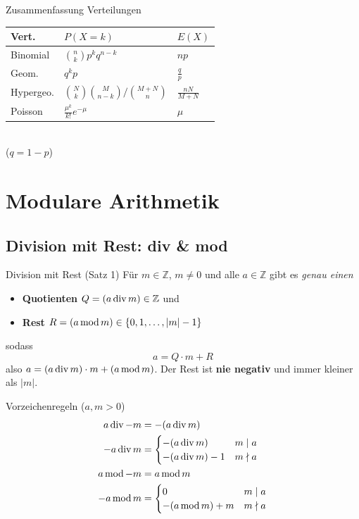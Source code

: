 \documentclass[a4paper, fontsize=7pt]{scrartcl}
\def\Z{\mathbb{Z}}  %
\newcommand{\Div}{\mskip3mu\mathrm{div}\mskip3mu}
\newcommand{\Mod}{\mskip3mu\mathrm{mod}\mskip3mu}
\renewcommand*{\arraystretch}{1.5}  %
\begin{document}
\begin{subbox}{Zusammenfassung Verteilungen}
\renewcommand*{\arraystretch}{1.6}
\begin{tabular}{@{}lll@{}}
\textbf{Vert.} & $P(X = k)$ & $E(X)$ \\ \hline
Binomial & $\binom{n}{k} p^k q^{n-k}$ & $np$ \\
Geom. & $q^k p$ & $\frac{q}{p}$ \\
Hypergeo. & $\binom{N}{k}\binom{M}{n-k} / \binom{M+N}{n}$ & $\frac{nN}{M+N}$ \\
Poisson & $\frac{\mu^k}{k!} e^{-\mu}$ & $\mu$
\end{tabular}\\
($q = 1 - p$)
\end{subbox}

\section{Modulare Arithmetik}

\subsection{Division mit Rest: div \& mod}

\begin{mainbox}{Division mit Rest (Satz 1)}
Für $m \in \Z$, $m \neq 0$ und alle $a \in \Z$ gibt es \emph{genau einen}
\begin{itemize}
    \item \textbf{Quotienten} $Q = (a \Div m) \in \Z$ und
    \item \textbf{Rest} $R = (a \Mod m) \in \{0, 1, \ldots, |m|-1\}$
\end{itemize}
sodass
$$\boxed{a = Q \cdot m + R}$$
also $a = (a \Div m) \cdot m + (a \Mod m)$.
Der Rest ist \textbf{nie negativ} und immer kleiner als $|m|$.
\end{mainbox}

\begin{mainbox}{Vorzeichenregeln ($a, m > 0$)}
\begin{align*}
a \Div {-m} &= -(a \Div m)\\
{-a} \Div m &= \begin{cases}
  -(a \Div m) & m \mid a\\
  -(a \Div m) - 1 & m \nmid a
\end{cases}\\
a \Mod {-m} &= a \Mod m\\
{-a} \Mod m &= \begin{cases}
  0 & m \mid a\\
  -(a \Mod m) + m & m \nmid a
\end{cases}
\end{align*}
\end{mainbox}
\end{document}
